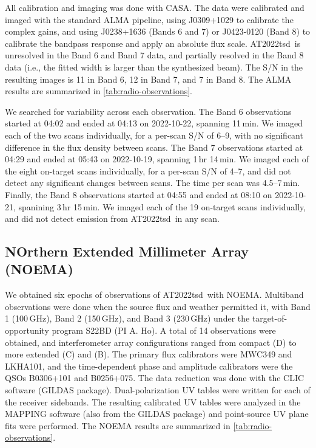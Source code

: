\documentclass{nature_plusfigure}
\newcommand{\at}{AT2022tsd}
\begin{document}
\begin{methods}
All calibration and imaging was done with CASA.
The data were calibrated and imaged
with the standard ALMA pipeline, using J0309+1029 to calibrate the complex gains, and using J0238+1636 (Bands 6 and 7) or J0423-0120 (Band 8) to calibrate the bandpass response and apply an absolute flux scale.
\at\ is unresolved in the Band 6 and Band 7 data, and partially resolved in the Band 8 data (i.e., the fitted width is larger than the synthesized beam).
The S/N in the resulting images is 11 in Band 6, 12 in Band 7, and 7 in Band 8.
The ALMA results are summarized in \ref{tab:radio-observations}.

We searched for variability across each observation. The Band 6 observations started at 04:02 and ended at 04:13 on 2022-10-22, spanning 11\,min. We imaged each of the two scans individually, for a per-scan S/N of 6--9, with no significant difference in the flux density between scans.
The Band 7 observations started at 04:29 and ended at 05:43 on 2022-10-19, spanning 1\,hr 14\,min.
We imaged each of the eight on-target scans individually, for a per-scan S/N of 4--7, and did not detect any significant changes between scans. The time per scan was 4.5--7\,min.
Finally, the Band 8 observations started at 04:55 and ended at 08:10 on 2022-10-21, spanining 3\,hr 15\,min. We imaged each of the 19 on-target scans individually, and did not detect emission from \at\ in any scan.

\subsection{NOrthern Extended Millimeter Array (NOEMA)}
\label{Methods:NOEMA}

We obtained six epochs of observations of \at\ with NOEMA. Multiband observations were done when the source flux and weather permitted it, with Band 1 (100\,GHz), Band 2 (150\,GHz), and Band 3 (230\,GHz) under the target-of-opportunity program S22BD (PI A. Ho). A total of 14 observations were obtained, and interferometer array configurations ranged from compact (D) to more extended (C) and (B). The primary flux calibrators were MWC349 and LKHA101, and the time-dependent phase and amplitude calibrators were the QSOs B0306+101 and B0256+075. The data reduction was done with the CLIC software (GILDAS package\cite{GILDAS}). 
Dual-polarization UV tables were written for each of the receiver sidebands. The resulting calibrated UV tables were analyzed in the MAPPING software (also from the GILDAS package) and point-source UV plane fits were performed.
The NOEMA results are summarized in \ref{tab:radio-observations}.


\end{methods}
\end{document}
